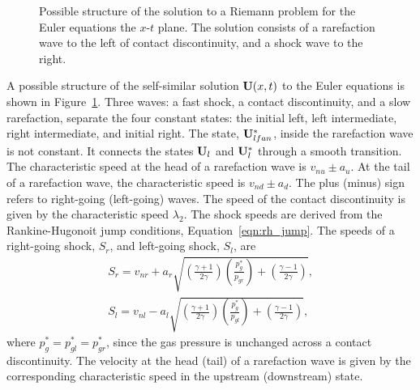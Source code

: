 \begin{figure}[htbp]\figSpace
\begin{center}

\end{center}
\caption{Possible structure of the solution to a Riemann problem for the Euler equations the $x$-$t$ plane.  The solution consists of a rarefaction wave to the left of contact discontinuity, and a shock wave to the right.}
\label{fig:euler_rstates}
\figSpace
\end{figure}

A possible structure of the self-similar solution $\mathbf{U}(x,t)$ to the Euler equations is shown in Figure~\ref{fig:euler_rstates}.  Three waves: a fast shock, a contact discontinuity, and a slow rarefaction, separate the four constant states: the initial left, left intermediate, right intermediate, and initial right.  The state, $\mathbf{U}^*_{lfan}$, inside the rarefaction wave is not constant.  It connects the states $\mathbf{U}_l$ and $\mathbf{U}^*_l$ through a smooth transition.  The characteristic speed at the head of a rarefaction wave is $v_{nu} \pm a_u$.  At the tail of a rarefaction wave, the characteristic speed is $v_{nd} \pm a_d$.  The plus (minus) sign refers to right-going (left-going) waves.  The speed of the contact discontinuity is given by the characteristic speed $\lambda_2$.  The shock speeds are derived from the Rankine-Hugonoit jump conditions, Equation~\ref{eqn:rh_jump}.  The speeds of a right-going shock, $S_r$, and left-going shock, $S_l$, are
\begin{gather*}
S_r = v_{nr} + a_r \sqrt{\left(\frac{\gamma + 1}{2\gamma}\right) \left(\frac{p_g^*}{p_{gr}}\right) + \left(\frac{\gamma - 1}{2\gamma}\right)}, \\
S_{l} = v_{nl} - a_l \sqrt{\left(\frac{\gamma + 1}{2\gamma}\right) \left(\frac{p_g^*}{p_{gl}}\right) + \left(\frac{\gamma - 1}{2\gamma}\right)},
\end{gather*}
where $p^*_{g} = p^*_{gl} = p^*_{gr}$, since the gas pressure is unchanged across a contact discontinuity.  The velocity at the head (tail) of a rarefaction wave is given by the corresponding characteristic speed in the upstream (downstream) state.  


